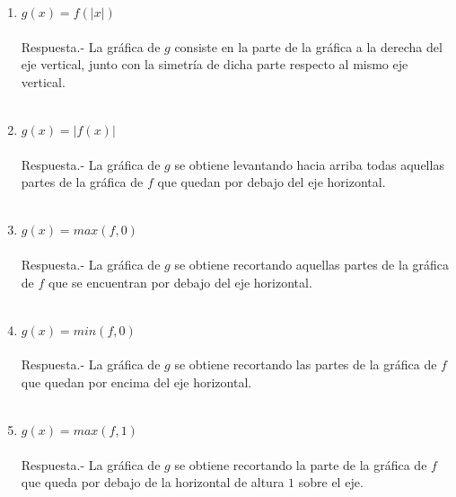 \begin{enumerate}[\bfseries 1.]
\begin{enumerate}[\bfseries (i)]
	\item $g(x)=f(|x|)$\\\\
	    Respuesta.-\; La gráfica de $g$ consiste en la parte de la gráfica a la derecha del eje vertical, junto con la simetría de dicha parte respecto al mismo eje vertical.\\\\

	\item $g(x)=|f(x)|$\\\\
	    Respuesta.-\; La gráfica de $g$ se obtiene levantando hacia arriba todas aquellas partes de la gráfica de $f$ que quedan por debajo del eje horizontal.\\\\

	\item $g(x)=max(f,0)$\\\\
	    Respuesta.-\; La gráfica de $g$ se obtiene recortando aquellas partes de la gráfica de $f$ que se encuentran por debajo del eje horizontal.\\\\ 

	\item $g(x)=min(f,0)$\\\\
	    Respuesta.-\; La gráfica de $g$ se obtiene recortando las partes de la gráfica de $f$ que quedan por encima del eje horizontal.\\\\

	\item $g(x)=max(f,1)$\\\\
	    Respuesta.-\; La gráfica de $g$ se obtiene recortando la parte de la gráfica de $f$ que queda por debajo de la horizontal de altura $1$ sobre el eje.\\\\

    \end{enumerate}


\end{enumerate}
